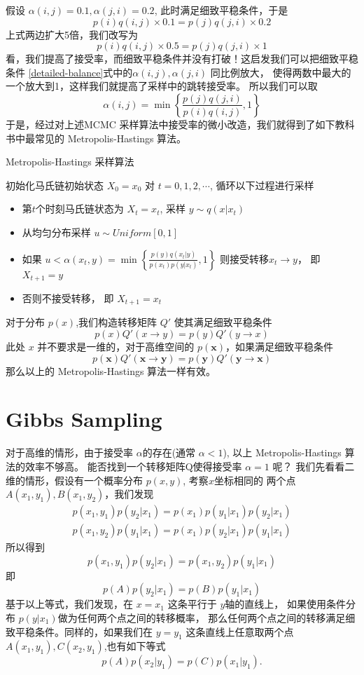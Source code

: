假设 $\alpha(i,j)=0.1, \alpha(j,i)=0.2$, 此时满足细致平稳条件，于是
$$ p(i)q(i,j)\times 0.1 = p(j)q(j,i) \times 0.2 $$
上式两边扩大5倍，我们改写为
$$ p(i)q(i,j) \times 0.5 = p(j)q(j,i) \times 1 $$
看，我们提高了接受率，而细致平稳条件并没有打破！这启发我们可以把细致平稳条件
\eqref{detailed-balance}式中的$\alpha(i,j),\alpha(j,i)$ 同比例放大，
使得两数中最大的一个放大到1，这样我们就提高了采样中的跳转接受率。
所以我们可以取
$$ \alpha(i,j) = \min\left\{\frac{p(j)q(j,i)}{p(i)q(i,j)},1\right\} $$
于是，经过对上述MCMC 采样算法中接受率的微小改造，我们就得到了如下教科书中最常见的 Metropolis-Hastings 算法。
\begin{algorithm}[htb]
\caption{Metropolis-Hastings 采样算法}
\begin{algorithmic}[1]
\STATE 初始化马氏链初始状态 $X_0 = x_0$
\STATE 对 $t=0,1,2,\cdots$, 循环以下过程进行采样
\begin{itemize}
\item 第$t$个时刻马氏链状态为 $X_t=x_t$, 采样 $y \sim q(x|x_t)$
\item 从均匀分布采样 $u \sim Uniform[0,1]$
\item 如果 $u < \alpha(x_t,y) = \min\left\{\frac{p(y)q(x_t|y)}{p(x_t)p(y|x_t)},1\right\}$
      则接受转移$x_t\rightarrow y$， 即 $X_{t+1} = y$
\item 否则不接受转移， 即 $X_{t+1} = x_t$
\end{itemize}
\end{algorithmic}
\end{algorithm}

对于分布 $p(x)$,我们构造转移矩阵 $Q'$ 使其满足细致平稳条件
$$ p(x) Q'(x\rightarrow y) = p(y) Q'(y\rightarrow x) $$
此处 $x$ 并不要求是一维的，对于高维空间的 $p(\mathbf{x})$，如果满足细致平稳条件
$$ p(\mathbf{x}) Q'(\mathbf{x}\rightarrow \mathbf{y})
= p(\mathbf{y}) Q'(\mathbf{y}\rightarrow \mathbf{x}) $$
那么以上的 Metropolis-Hastings 算法一样有效。

\section{Gibbs Sampling}
对于高维的情形，由于接受率 $\alpha$的存在(通常 $\alpha < 1$), 以上 Metropolis-Hastings 算法的效率不够高。
能否找到一个转移矩阵Q使得接受率 $\alpha=1$ 呢？
我们先看看二维的情形，假设有一个概率分布 $p(x,y)$, 考察$x$坐标相同的
两个点$A(x_1,y_1), B(x_1,y_2)$，我们发现
\begin{align*}
p(x_1,y_1)p(y_2|x_1) = p(x_1)p(y_1|x_1)p(y_2|x_1) \\
p(x_1,y_2)p(y_1|x_1) = p(x_1)p(y_2|x_1)p(y_1|x_1)
\end{align*}
所以得到
\begin{equation}
\label{gibbs-detailed-balance}
 p(x_1,y_1)p(y_2|x_1) =  p(x_1,y_2)p(y_1|x_1)
\end{equation}
即
$$ p(A)p(y_2|x_1) =  p(B)p(y_1|x_1) $$
基于以上等式，我们发现，在 $x=x_1$ 这条平行于 $y$轴的直线上，
如果使用条件分布 $p(y|x_1)$做为任何两个点之间的转移概率，
那么任何两个点之间的转移满足细致平稳条件。同样的，如果我们在 $y=y_1$ 这条直线上任意取两个点
$A(x_1,y_1), C(x_2,y_1)$,也有如下等式
$$ p(A)p(x_2|y_1) =  p(C)p(x_1|y_1). $$

